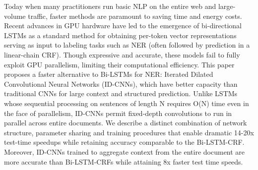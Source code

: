 Today when many practitioners run basic NLP on the entire web and large-volume traffic, faster methods are paramount to saving time and energy costs. Recent advances in GPU hardware have led to the emergence of bi-directional LSTMs as a standard method for obtaining per-token vector representations serving as input to labeling tasks such as NER (often followed by prediction in a linear-chain CRF). Though expressive and accurate, these models fail to fully exploit GPU parallelism, limiting their computational efficiency. This paper proposes a faster alternative to Bi-LSTMs for NER: Iterated Dilated Convolutional Neural Networks (ID-CNNs), which have better capacity than traditional CNNs for large context and structured prediction. Unlike LSTMs whose sequential processing on sentences of length N requires O(N) time even in the face of parallelism, ID-CNNs permit fixed-depth convolutions to run in parallel across entire documents. We describe a distinct combination of network structure, parameter sharing and training procedures that enable dramatic 14-20x test-time speedups while retaining accuracy comparable to the Bi-LSTM-CRF. Moreover, ID-CNNs trained to aggregate context from the entire document are more accurate than Bi-LSTM-CRFs while attaining 8x faster test time speeds.
